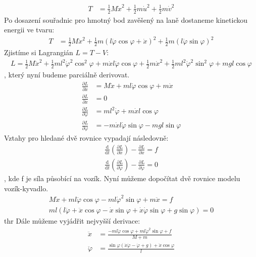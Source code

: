 \documentclass[a4paper, 12pt]{article}
\begin{document}
			\begin{align*}
				T &= \frac{1}{2}M\dot{x}^2+\frac{1}{2}m\dot{u}^2+\frac{1}{2}m\dot{v}^2
			\end{align*}
			Po dosazení souřadnic pro hmotný bod zavěšený na laně dostaneme kinetickou energii ve tvaru:
			\begin{align*}
				T &= \frac{1}{2}M\dot{x}^2+\frac{1}{2}m(l\dot{\varphi}\cos\varphi+\dot{x})^2+\frac{1}{2}m(l\dot{\varphi}\sin\varphi)^2
			\end{align*}
			Zjistíme si Lagrangián $L = T - V$:
			\begin{align*}
				L = \frac{1}{2}M\dot{x}^2+\frac{1}{2}ml^2\dot{\varphi}^2\cos^2\varphi+m\dot{x}l\dot{\varphi}\cos\varphi+\frac{1}{2}m\dot{x}^2+\frac{1}{2}ml^2\dot{\varphi}^2\sin^2\varphi+mgl\cos\varphi
			\end{align*}
			, který nyní budeme parciálně derivovat.
			\begin{align*}
				\frac{\partial L}{\partial\dot{x}} &= M\dot{x}+ml\dot{\varphi}\cos\varphi+m\dot{x}\\
				\frac{\partial L}{\partial x} &= 0\\
				\frac{\partial L}{\partial \dot{\varphi}} &= ml^2\dot{\varphi}+m\dot{x}l\cos\varphi\\
				\frac{\partial L}{\partial \varphi} &= -m\dot{x}l\dot{\varphi}\sin\varphi-mgl\sin\varphi
			\end{align*}
			Vztahy pro hledané dvě rovnice vypadají následovně:
			\begin{align*}
				\frac{\mathrm{d}}{\mathrm{d}t}\left(\frac{\partial L}{\partial \dot{x}}\right) - \frac{\partial L}{\partial x} = f\\
				\frac{\mathrm{d}}{\mathrm{d}t}\left(\frac{\partial L}{\partial \dot{\varphi}}\right) - \frac{\partial L}{\partial \varphi} = 0
			\end{align*}
			, kde f je síla působící na vozík. Nyní můžeme dopočítat dvě rovnice modelu vozík-kyvadlo.
			\begin{align*}
				M\dot{x}+ml\ddot{\varphi}\cos\varphi-ml\dot{\varphi}^2\sin\varphi+m\ddot{x} = f\\
				ml\left(l\ddot{\varphi}+\ddot{x}\cos\varphi-\dot{x}\sin\varphi+\dot{x}\dot{\varphi}\sin\varphi+g\sin\varphi\right)=0
			\end{align*}
thr			Dále můžeme vyjádřit nejvyšší derivace:
			\begin{align*}
				\ddot{x} &= \frac{-ml\ddot{\varphi}\cos\varphi+ml\dot{\varphi}^2\sin\varphi+f}{M+m}\\
				\ddot{\varphi} &= \frac{\sin\varphi\left(\dot{x}\dot{\varphi}-\dot{\varphi}+g\right)+\ddot{x}\cos\varphi}{l}
			\end{align*}
\end{document}
